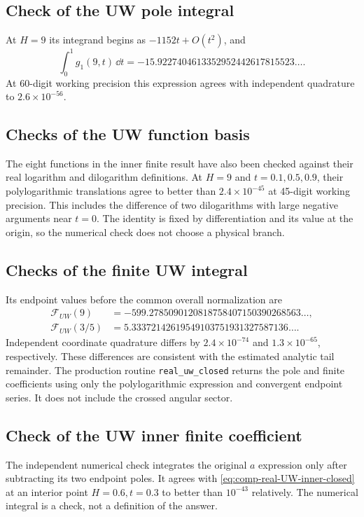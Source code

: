 \subsection{Check of the UW pole integral}
At $H=9$ its integrand begins as $-1152t+O(t^2)$, and
\begin{equation}
 \int_0^1g_1(9,t)\,\dd t
 =-15.9227404613352952442617815523\ldots.
\end{equation}
At 60-digit working precision this expression agrees with independent
quadrature to $2.6\times10^{-56}$.

\subsection{Checks of the UW function basis}
The eight functions in the inner finite result have also been checked
against their real logarithm and dilogarithm definitions. At $H=9$ and
$t=0.1,0.5,0.9$, their polylogarithmic translations agree to better than
$2.4\times10^{-45}$ at 45-digit working precision. This includes the
difference of two dilogarithms with large negative arguments near $t=0$.
The identity is fixed by differentiation and its value at the origin,
so the numerical check does not choose a physical branch.

\subsection{Checks of the finite UW integral}
Its endpoint values before the common overall normalization are
\begin{align}
 \mathcal F_{UW}(9)
 &=-599.2785090120818758407150390268563\ldots,\\
 \mathcal F_{UW}(3/5)
 &=5.33372142619549103751931327587136\ldots.
\end{align}
Independent coordinate quadrature differs by $2.4\times10^{-74}$ and
$1.3\times10^{-65}$, respectively. These differences are consistent with
the estimated analytic tail remainder. The production routine
\texttt{real\_uw\_closed} returns the pole and finite coefficients using
only the polylogarithmic expression and convergent endpoint series.
It does not include the crossed angular sector.

\subsection{Check of the UW inner finite coefficient}
The independent numerical check integrates
the original $a$ expression only after subtracting its two endpoint
poles. It agrees with \eqref{eq:comp-real-UW-inner-closed} at an
interior point $H=0.6,t=0.3$ to better than $10^{-43}$ relatively.
The numerical integral is a check, not a definition of the answer.

